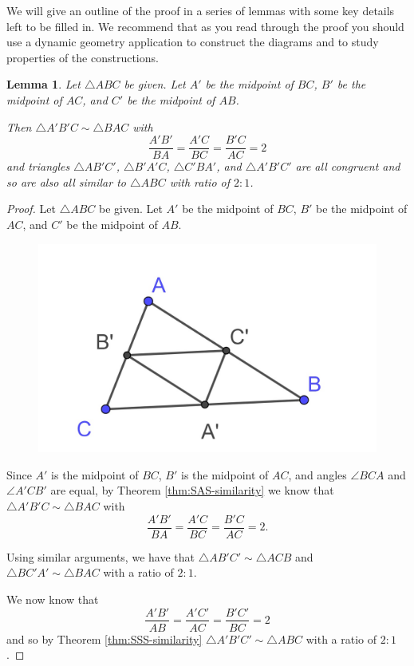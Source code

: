 \documentclass[
]{book}
\newtheorem{lemma}{Lemma}[chapter]
\theoremstyle{definition}
\theoremstyle{definition}
\theoremstyle{definition}
\theoremstyle{definition}
\theoremstyle{remark}
\begin{document}
We will give an outline of the proof in a series of lemmas with some key details left to be filled in. We recommend that as you read through the proof you should use a dynamic geometry application to construct the diagrams and to study properties of the constructions.

\begin{lemma}
Let \(\triangle ABC\) be given. Let \(A'\) be the midpoint of \(BC\), \(B'\) be the midpoint of \(AC\), and \(C'\) be the midpoint of \(AB\).

Then \(\triangle A'B'C\sim \triangle BAC\) with \[\frac{A'B'}{BA}= \frac{A'C}{BC} = \frac{B'C}{AC}=2\] and triangles \(\triangle AB'C'\), \(\triangle B'A'C\), \(\triangle C'BA'\), and \(\triangle A'B'C'\) are all congruent and so are also all similar to \(\triangle ABC\) with ratio of \(2:1\).
\end{lemma}

\begin{proof}
Let \(\triangle ABC\) be given. Let \(A'\) be the midpoint of \(BC\), \(B'\) be the midpoint of \(AC\), and \(C'\) be the midpoint of \(AB\).

\begin{figure}

{\centering \includegraphics[width=0.3\linewidth]{images/midpoint-triangle-similarity} 

}

\end{figure}

Since \(A'\) is the midpoint of \(BC\), \(B'\) is the midpoint of \(AC\), and angles \(\angle BCA\) and \(\angle A'CB'\) are equal, by Theorem \ref{thm:SAS-similarity} we know that \(\triangle A'B'C\sim \triangle BAC\) with \[\frac{A'B'}{BA}= \frac{A'C}{BC} = \frac{B'C}{AC}=2.\]

Using similar arguments, we have that \(\triangle AB'C' \sim \triangle ACB\) and \(\triangle BC'A' \sim \triangle BAC\) with a ratio of \(2:1\).

We now know that \[\frac{A'B'}{AB}=\frac{A'C'}{AC} = \frac{B'C'}{BC} = 2\] and so by Theorem \ref{thm:SSS-similarity} \(\triangle A'B'C' \sim \triangle ABC\) with a ratio of \(2:1\).
\end{proof}
\end{document}
